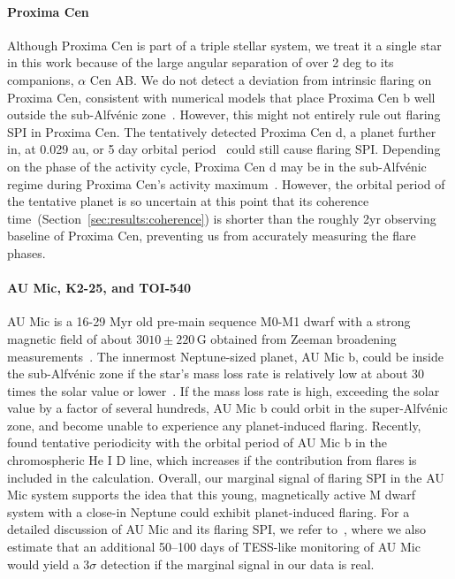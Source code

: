 \documentclass[twocolumn]{aastex631}
\begin{document}
\paragraph{Proxima Cen}
\label{sec:results:individualstars:proxima}
Although Proxima Cen is part of a triple stellar system, we treat it a single star in this work because of the large angular separation of over 2 deg to its companions, $\alpha$ Cen AB. We do not detect a deviation from intrinsic flaring on Proxima Cen, consistent with numerical models that place Proxima Cen b well outside the sub-Alfv\'enic zone~\citep{alvarado-gomez2020earthlike, kavanagh2021planetinduced, garraffo2022revisiting}. However, this might not entirely rule out flaring SPI in Proxima Cen. The tentatively detected Proxima Cen d, a planet further in, at 0.029 au, or 5 day orbital period~\citep{faria2022candidate, artigau2022linebyline} could still cause flaring SPI. Depending on the phase of the activity cycle, Proxima Cen d may be in the sub-Alfv\'enic regime during Proxima Cen's activity maximum~\citep{alvarado-gomez2020earthlike}. However, the orbital period of the tentative planet is so uncertain at this point that its coherence time~(Section~\ref{sec:results:coherence}) is shorter than the roughly 2yr observing baseline of Proxima Cen, preventing us from accurately measuring the flare phases. 


\paragraph{AU Mic, K2-25, and TOI-540}
\label{sec:results:individualstars:aumic}

AU Mic is a 16-29 Myr old pre-main sequence M0-M1 dwarf with a strong magnetic field of about $3010\pm220\,$G obtained from Zeeman broadening measurements~\citep{reiners2022magnetism}. The innermost Neptune-sized planet, AU Mic b, could be inside the sub-Alfv\'enic zone if the star's mass loss rate is relatively low at about 30 times the solar value or lower~\citep{alvarado-gomez2022simulating}. If the mass loss rate is high, exceeding the solar value by a factor of several hundreds, AU Mic b could orbit in the super-Alfv\'enic zone, and become unable to experience any planet-induced flaring. Recently, \citet{klein2022one} found tentative periodicity with the orbital period of AU Mic b in the chromospheric He I D line, which increases if the contribution from flares is included in the calculation. Overall, our marginal signal of flaring SPI in the AU Mic system supports the idea that this young, magnetically active M dwarf system with a close-in Neptune could exhibit planet-induced flaring.
For a detailed discussion of AU Mic and its flaring SPI, we refer to~\cite{ilin2022searching}, where we also estimate that an additional 50–100 days of TESS-like monitoring of AU Mic would yield a $3\sigma$ detection if the marginal signal in our data is real.
\end{document}
